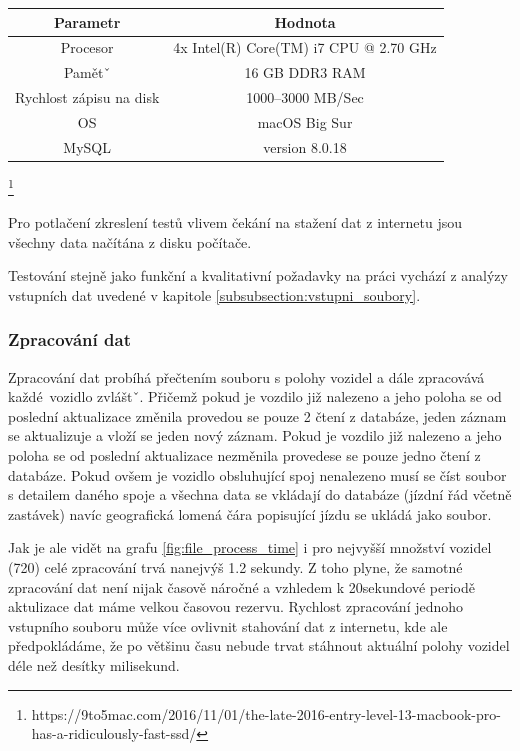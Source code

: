 \begin{center}
	\begin{table}[ht]
\centering
\begin{tabular}{|c|c|}
\hline
 Parametr & Hodnota \\ \hline \hline
 Procesor & 4x Intel(R) Core(TM) i7 CPU @ 2.70 GHz\\ \hline
 Pamětˇ & 16 GB DDR3 RAM  \\  \hline
 Rychlost zápisu na disk & 1000--3000 MB/Sec \\ \hline
 OS & macOS Big Sur\\ \hline
 MySQL & version 8.0.18\\ \hline
\end{tabular}
\label{table:hw}
\end{table}
\end{center}
\footnote{https://9to5mac.com/2016/11/01/the-late-2016-entry-level-13-macbook-pro-has-a-ridiculously-fast-ssd/}
\bigbreak

Pro potlačení zkreslení testů vlivem čekání na stažení dat z internetu jsou všechny data načítána z disku počítače.

\bigbreak

Testování stejně jako funkční a kvalitativní požadavky na práci vychází z analýzy vstupních dat uvedené v kapitole \ref{subsubsection:vstupni_soubory}.

\subsubsection{Zpracování dat}

Zpracování dat probíhá přečtením souboru s polohy vozidel a dále zpracovává každé vozidlo zvláštˇ. Přičemž pokud je vozdilo již nalezeno a jeho poloha se od poslední aktualizace změnila provedou se pouze 2 čtení z databáze, jeden záznam se aktualizuje a vloží se jeden nový záznam. Pokud je vozdilo již nalezeno a jeho poloha se od poslední aktualizace nezměnila provedese se pouze jedno čtení z databáze. Pokud ovšem je vozidlo obsluhující spoj nenalezeno musí se číst soubor s detailem daného spoje a všechna data se vkládají do databáze (jízdní řád včetně zastávek) navíc geografická lomená čára popisující jízdu se ukládá jako soubor.

\bigbreak

Jak je ale vidět na grafu \ref{fig:file_process_time} i pro nejvyšší množství vozidel (720) celé zpracování trvá nanejvýš 1.2 sekundy. Z toho plyne, že samotné zpracování dat není nijak časově náročné a vzhledem k 20sekundové periodě aktulizace dat máme velkou časovou rezervu. Rychlost zpracování jednoho vstupního souboru může více ovlivnit stahování dat z internetu, kde ale předpokládáme, že po většinu času nebude trvat stáhnout aktuální polohy vozidel déle než desítky milisekund.

